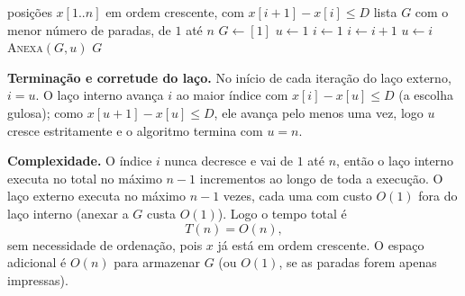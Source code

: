 \documentclass[11pt,a4paper]{article}
\begin{document}
\begin{algorithm}[H]
\caption{\textsc{Paradas-Hotéis}$(x, n, D)$}
\begin{algorithmic}[1]
\Require posições $x[1..n]$ em ordem crescente, com $x[i+1]-x[i]\le D$
\Ensure lista $G$ com o menor número de paradas, de $1$ até $n$
\State $G \gets [1]$
\State $u \gets 1$ 
\State $i \gets 1$ 
    \State $i \gets i + 1$ 
  \EndWhile
  \State $u \gets i$ 
  \State \textsc{Anexa}$(G, u)$
\EndWhile
\State \Return $G$
\end{algorithmic}
\end{algorithm}

\noindent\textbf{Terminação e corretude do laço.} No início de cada iteração do
laço externo, $i = u$. O laço interno avança $i$ ao maior índice com
$x[i]-x[u]\le D$ (a escolha gulosa); como $x[u+1]-x[u]\le D$, ele avança pelo menos
uma vez, logo $u$ cresce estritamente e o algoritmo termina com $u=n$.

\noindent\textbf{Complexidade.} O índice $i$ nunca decresce e vai de $1$ até $n$,
então o laço interno executa no total no máximo $n-1$ incrementos ao longo de toda
a execução. O laço externo executa no máximo $n-1$ vezes, cada uma com custo
$O(1)$ fora do laço interno (anexar a $G$ custa $O(1)$). Logo o tempo total é
\[ T(n) = O(n), \]
sem necessidade de ordenação, pois $x$ já está em ordem crescente. O espaço adicional
é $O(n)$ para armazenar $G$ (ou $O(1)$, se as paradas forem apenas impressas).

\clearpage

\end{document}
